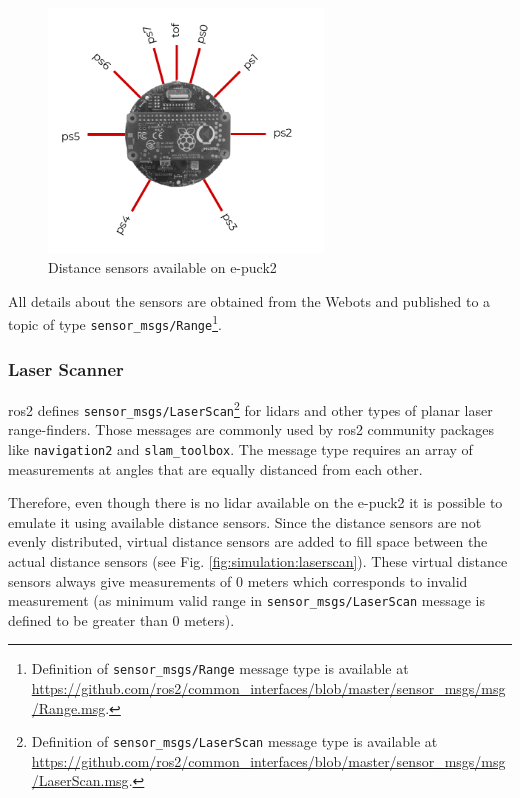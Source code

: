 \begin{figure}[H]
    \centering
    \includegraphics[width=0.65\textwidth]{simulation/figures/distance_sensors.pdf}
    \caption{Distance sensors available on e-puck2}
    \label{fig:simulation:distance_sensors}
\end{figure}

All details about the sensors are obtained from the Webots and published to a topic of type \texttt{sensor\_msgs/Range}\footnote{Definition of \texttt{sensor\_msgs/Range} message type is available at \url{https://github.com/ros2/common_interfaces/blob/master/sensor_msgs/msg/Range.msg}.}.

\subsubsection{Laser Scanner}
\ac{ros2} defines \texttt{sensor\_msgs/LaserScan}\footnote{Definition of \texttt{sensor\_msgs/LaserScan} message type is available at \url{https://github.com/ros2/common_interfaces/blob/master/sensor_msgs/msg/LaserScan.msg}.} for \acp{lidar} and other types of planar laser range-finders.
Those messages are commonly used by \ac{ros2} community packages like \texttt{navigation2} and \texttt{slam\_toolbox}.
The message type requires an array of measurements at angles that are equally distanced from each other. 

Therefore, even though there is no \ac{lidar} available on the e-puck2 it is possible to emulate it using available distance sensors.
Since the distance sensors are not evenly distributed, virtual distance sensors are added to fill space between the actual distance sensors (see Fig. \ref{fig:simulation:laserscan}).
These virtual distance sensors always give measurements of 0 meters which corresponds to invalid measurement (as minimum valid range in \texttt{sensor\_msgs/LaserScan} message is defined to be greater than 0 meters).

